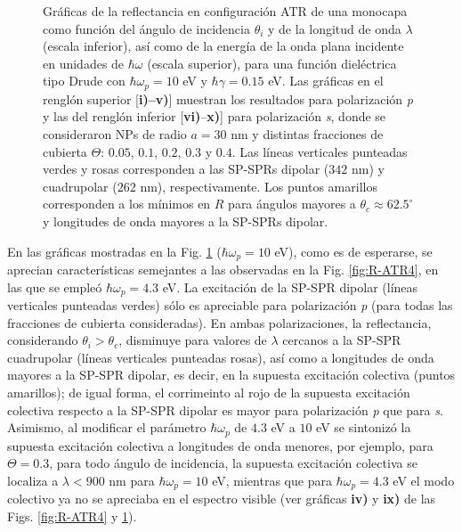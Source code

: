 \begin{figure}[b!]
\vspace*{-.5em}
	\caption{Gráficas de la reflectancia en configuración ATR de una monocapa como función del ángulo de incidencia $\theta_i$ y de la longitud de onda $\lambda$ (escala inferior), así como de la energía de la onda plana incidente en unidades de $\hbar\omega$ (escala superior), para una función dieléctrica tipo Drude con $\hbar\omega_p=10$ eV  y  $\hbar\gamma=0. 15$ eV.  Las gráficas   en el renglón superior [\textbf{i)--v)}] muestran los resultados  para  polarización \emph{p} y las del renglón inferior  [\textbf{vi)}--\textbf{x)}] para polarización  \emph{s}, donde se consideraron NPs de radio $a=30$ nm y distintas fracciones de cubierta $\Theta$: $0. 05$, $0. 1$, $0. 2$, $0. 3$ y $0. 4$. Las líneas verticales punteadas verdes y rosas corresponden a las SP-SPRs dipolar ($342$ nm) y cuadrupolar ($262$ nm), respectivamente.  Los puntos amarillos corresponden a los mínimos en $R$ para ángulos mayores a $\theta_c\approx 62.5^\circ$ y longitudes de onda mayores a la SP-SPRs dipolar. }	\label{fig:R-ATR10}	
	\end{figure}		
	
En las gráficas mostradas en la Fig. \ref{fig:R-ATR10} ($\hbar\omega_p = 10$ eV), como es de esperarse, se aprecian características semejantes a las observadas en la Fig. \ref{fig:R-ATR4}, en las que se empleó $\hbar\omega_p = 4.3$ eV. La excitación de la SP-SPR dipolar (líneas verticales punteadas verdes) sólo es apreciable para polarización \emph{p} (para todas las fracciones de cubierta consideradas). En ambas polarizaciones, la reflectancia, considerando $\theta_i>\theta_c$, disminuye para valores de $\lambda$ cercanos a la SP-SPR cuadrupolar (líneas verticales punteadas rosas), así como a longitudes de onda mayores a la SP-SPR dipolar, es decir, en la supuesta excitación colectiva  (puntos amarillos); de igual forma, el corrimeinto al rojo de la supuesta excitación colectiva respecto a la SP-SPR dipolar es mayor para polarización \emph{p} que para \emph{s}.  Asimismo, al modificar el parámetro $\hbar\omega_p$ de $4.3$ eV a $10$ eV se sintonizó la supuesta excitación colectiva a longitudes de onda menores, por ejemplo, para $\Theta = 0.3$, para todo ángulo de incidencia, la supuesta excitación colectiva se localiza a $\lambda<900$ nm para $\hbar\omega_p=10$ eV, mientras que para $\hbar\omega_p=4.3$ eV el modo colectivo ya no se apreciaba en el espectro visible (ver gráficas \textbf{iv)} y \textbf{ix)} de las Figs. \ref{fig:R-ATR4} y \ref{fig:R-ATR10}).

